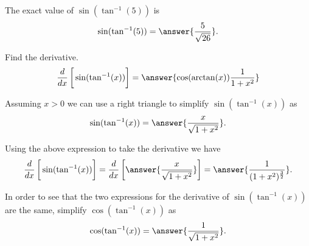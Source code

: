 \documentclass{ximera}
\author{Nela Lakos \and Kyle Parsons}
\begin{document}
\begin{exercise}

The exact value of $\sin(\tan^{-1}(5))$ is
\[
\sin(\tan^{-1}(5)) = \answer{\frac{5}{\sqrt{26}}}.
\]

Find the derivative.
\[
\ddx\left[\vphantom{\ddx}\sin(\tan^{-1}(x))\right] = \answer{\cos(\arctan(x))\frac{1}{1+x^2}}
\]

Assuming $x>0$ we can use a right triangle to simplify $\sin(\tan^{-1}(x))$ as
\[
\sin(\tan^{-1}(x)) = \answer{\frac{x}{\sqrt{1+x^2}}}.
\]

Using the above expression to take the derivative we have
\[
\ddx\left[\vphantom{\ddx}\sin(\tan^{-1}(x))\right] = \ddx\left[\vphantom{\ddx}\answer{\frac{x}{\sqrt{1+x^2}}}\right] = \answer{\frac{1}{(1+x^2)^{\frac{3}{2}}}}.
\]

In order to see that the two expressions for the derivative of $\sin(\tan^{-1}(x))$ are the same, simplify $\cos(\tan^{-1}(x))$ as
\[
\cos(\tan^{-1}(x)) = \answer{\frac{1}{\sqrt{1+x^2}}}.
\]

\end{exercise}
\end{document}
